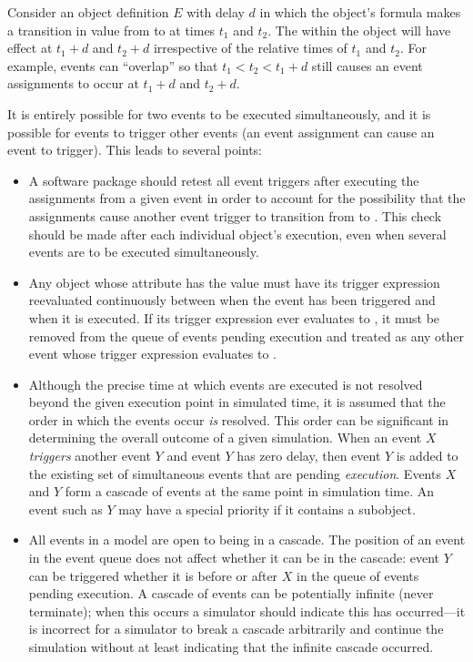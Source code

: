 Consider an \Event object definition $E$ with delay $d$ in which
the \Trigger object's  formula makes a transition in
value from  to  at times $t_1$ and $t_2$.
The \EventAssignment within the \Event object will have effect at
$t_1+d$ and $t_2+d$ irrespective of the relative times of $t_1$
and $t_2$.  For example, events can ``overlap'' so that $t_1 < t_2
< t_1+d$ still causes an event assignments to occur at $t_1+d$ and
$t_2+d$.

It is entirely possible for two events to be executed
simultaneously, and it is possible for events to trigger other events
(\ie an event assignment can cause an event to trigger).  This leads
to several points:
\begin{itemize}

\item A software package should retest all event triggers after
  executing the assignments from a given event in order to account for the
  possibility that the assignments cause another event trigger to
  transition from  to .  This check should be
  made after each individual \Event object's execution, even when
  several events are to be executed simultaneously.  

\item Any \Event object whose \Trigger {}
  attribute has the value  must have its trigger
  expression reevaluated continuously between when the event has
  been triggered and when it is executed.  If its trigger expression
  ever evaluates to , it must be removed from the queue
  of events pending execution and treated as any other event whose
  trigger expression evaluates to .

\item Although the precise time at which events are executed is
  not resolved beyond the given execution point in simulated time,
  it is assumed that the order in which the events occur \emph{is}
  resolved.  This order can be significant in determining the
  overall outcome of a given simulation.  When an event $X$
  \emph{triggers} another event $Y$ and event $Y$ has zero delay,
  then event $Y$ is added to the existing set of simultaneous
  events that are pending \emph{execution}.  Events $X$ and $Y$
  form a cascade of events at the same point in simulation time.
  An event such as $Y$ may have a special priority if it contains
  a \Priority subobject.

\item All events in a model are open to being in a cascade.  The
  position of an event in the event queue does not affect whether
  it can be in the cascade: event $Y$ can be triggered whether it
  is before or after $X$ in the queue of events pending execution.
  A cascade of events can be potentially infinite (never
  terminate); when this occurs a simulator should indicate this
  has occurred---it is incorrect for a simulator to break a
  cascade arbitrarily and continue the simulation without at least
  indicating that the infinite cascade occurred.


\end{itemize}
